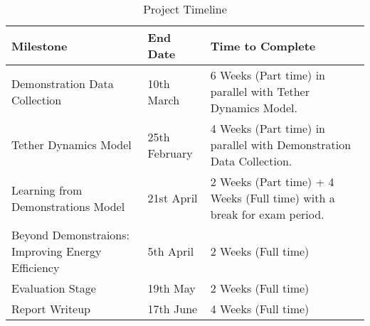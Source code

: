 \begin{table}[h]
  \centering
  \begin{tabular}{|p{5cm}|p{3cm}|p{6cm}|}

  \hline
  Milestone & End Date & Time to Complete \\ \hline
  Demonstration Data Collection    & 
  10th March      & 
  6 Weeks (Part time) in parallel with Tether Dynamics Model.        \\ \hline

  Tether Dynamics Model  & 
  25th February      & 
  4 Weeks (Part time) in parallel with Demonstration Data Collection.      \\ \hline

  Learning from Demonstrations Model    & 
  21st April      & 
  2 Weeks (Part time) + 4 Weeks (Full time) with a break for exam period.        \\ \hline

  Beyond Demonstraions: Improving Energy Efficiency    & 
  5th April      & 
  2 Weeks (Full time)        \\ \hline

  Evaluation Stage    & 
  19th May      & 
  2 Weeks (Full time)        \\ \hline

  Report Writeup    & 
  17th June      & 
  4 Weeks (Full time)        \\ \hline
  \end{tabular}
  \caption{Project Timeline}
  \label{table:project-timeline}
\end{table}
